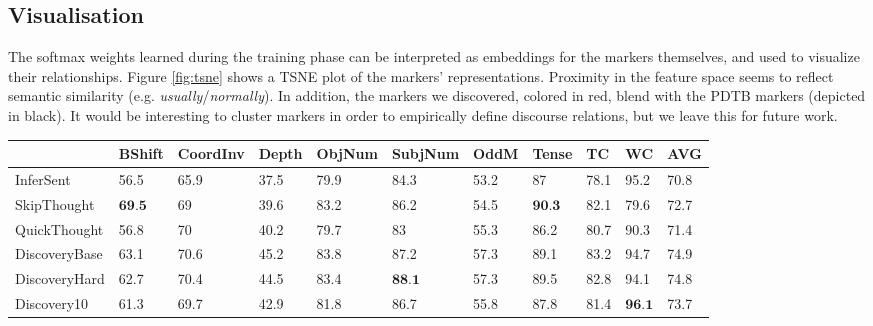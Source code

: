 \documentclass[11pt,a4paper]{article}
\begin{document}
\subsection{Visualisation}
The softmax weights learned during the training phase can be interpreted as embeddings for the markers themselves, and used to visualize their relationships.
Figure \ref{fig:tsne} shows a TSNE \citep{vanDerMaaten2008} plot of the markers' representations. Proximity in the feature space seems to reflect semantic similarity (e.g. \textit{usually}/\textit{normally}). In addition, the markers we discovered, colored in red, blend with the PDTB markers (depicted in black).
It would be interesting to cluster markers in order to empirically define discourse relations, but we leave this for future work. 
\begin{table*}[htb]
\centering
\small
\begin{tabular}{lllllllllll}
\toprule
{} &      BShift & CoordInv&            Depth &        ObjNum &       SubjNum &        OddM &            Tense &  TC&      WC&              AVG \\
\midrule
InferSent         &             56.5 &                  65.9 &             37.5 &             79.9 &             84.3 &             53.2 &               87 &             78.1 &             95.2 &             70.8 \\
SkipThought       &  $\textbf{69.5}$ &                    69 &             39.6 &             83.2 &             86.2 &             54.5 &  $\textbf{90.3}$ &             82.1 &             79.6 &             72.7 \\
QuickThought      &             56.8 &                    70 &             40.2 &             79.7 &               83 &             55.3 &             86.2 &             80.7 &             90.3 &             71.4 \\
DiscoveryBase         &             63.1 &                  70.6 &             45.2 &             83.8 &             87.2 &             57.3 &             89.1 &             83.2 &             94.7 &             74.9 \\
DiscoveryHard     &             62.7 &                  70.4 &             44.5 &             83.4 &  $\textbf{88.1}$ &             57.3 &             89.5 &             82.8 &             94.1 &             74.8 \\
Discovery10       &             61.3 &                  69.7 &             42.9 &             81.8 &             86.7 &             55.8 &             87.8 &             81.4 &  $\textbf{96.1}$ &             73.7 \\

\end{tabular}
\end{table*}
\end{document}
